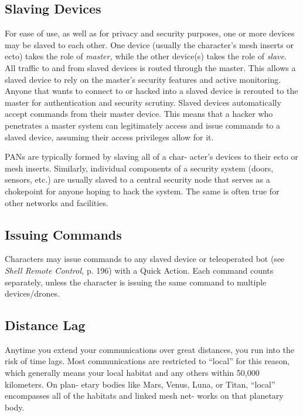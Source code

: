 \subsection{Slaving Devices}


For ease of use, as well as for privacy and security 
purposes, one or more devices may be slaved to each 
other. One device (usually the character's mesh inserts 
or ecto) takes the role of \textit{master,} while the other 
device(s) takes the role of \textit{slave.} All traffic to and 
from slaved devices is routed through the master. This 
allows a slaved device to rely on the master's security 
features and active monitoring. Anyone that wants to 
connect to or hacked into a slaved device is rerouted 
to the master for authentication and security scrutiny.
Slaved devices automatically accept commands from 
their master device. This means that a hacker who 
penetrates a master system can legitimately access 
and issue commands to a slaved device, assuming their 
access privileges allow for it.

PANs are typically formed by slaving all of a char-
acter's devices to their ecto or mesh inserts. Similarly, 
individual components of a security system (doors, 
sensors, etc.) are usually slaved to a central security 
node that serves as a chokepoint for anyone hoping 
to hack the system. The same is often true for other 
networks and facilities.

\subsection{Issuing Commands}

Characters may issue commands to any slaved device 
or teleoperated bot (see \textit{Shell Remote Control,} p. 196) 
with a Quick Action. Each command counts separately, 
unless the character is issuing the same command to 
multiple devices/drones.

\subsection{Distance Lag}

Anytime you extend your communications over great 
distances, you run into the risk of time lags. Most 
communications are restricted to ``local'' for this 
reason, which generally means your local habitat 
and any others within 50,000 kilometers. On plan-
etary bodies like Mars, Venus, Luna, or Titan, ``local'' 
encompasses all of the habitats and linked mesh net-
works on that planetary body.

